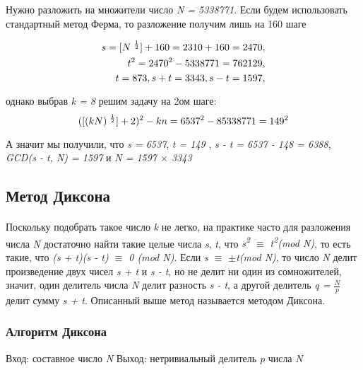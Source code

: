   \begin{example}
    Нужно разложить на множители число \textit{N = 5338771}. Если будем использовать стандартный метод Ферма, то разложение получим лишь на 160 шаге
    
      \begin{subequations}
	\begin{align}
	  s = [N\textsuperscript{ {$\frac{1}{2}$}}] + 160 = 2310 + 160 = 2470, \\
	  t\textsuperscript{2} = 2470\textsuperscript{2} - 5338771 = 762129, \\
	  t = 873, s + t = 3343, s - t = 1597, 
       \end{align}
      \end{subequations}	
    
    однако выбрав \textit{k = 8} решим задачу на 2ом шаге: 
      \begin{equation}
       ([(kN)\textsuperscript{ {$\frac{1}{2}$}}] + 2)\textsuperscript{2} - k n = 6537\textsuperscript{2} - 8 5338771 = 149\textsuperscript{2}
      \end{equation}	
	
    А значит мы получили, что \textit{s = 6537}, \textit{t = 149} , \textit{s - t = 6537 - 148 = 6388}, \textit{GCD(s - t, N) = 1597} и \textit{N = 1597 {$\times$} 3343}
  \end{example}


\subsection{Метод Диксона}

\paragraph{} Поскольку подобрать такое число \textit{k} не легко, на практике часто для разложения числа \textit{N} достаточно найти такие целые числа \textit{s},
\textit{t}, что \textit{s\textsuperscript{2} {$\equiv$} t\textsuperscript{2}(mod N)}, то есть такие, что \textit{(s + t)(s - t) {$\equiv$} 0 (mod N)}. 
Если \textit{s {$\equiv$} {$\pm$}t(mod N)}, то число \textit{N} делит произведение двух чисел \textit{s + t} и \textit{s - t}, но не делит ни один 
из сомножителей, значит, один делитель числа \textit{N} делит разность \textit{s - t}, а другой делитель \textit{q = {$\frac{N}{p}$}} делит сумму \textit{s + t}.
Описанный выше метод называется методом Диксона.

  \subsubsection{Алгоритм Диксона}
  Вход: составное число \textit{N}
  Выход: нетривиальный делитель \textit{p} числа \textit{N}
  
